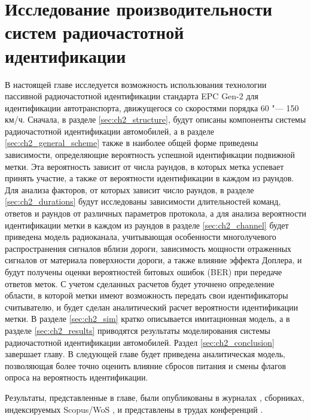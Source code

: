 \chapter{Исследование производительности систем радиочастотной идентификации}\label{ch:ch2}

В настоящей главе исследуется возможность использования технологии пассивной радиочастотной идентификации стандарта EPC Gen-2 \cite{StdGen2} для идентификации автотранспорта, движущегося со скоростями порядка 60 "--- 150 км/ч. Сначала, в разделе \ref{sec:ch2_structure}, будут описаны компоненты системы радиочастотной идентификации автомобилей, а в разделе \ref{sec:ch2_general_scheme} также в наиболее общей форме приведены зависимости, определяющие вероятность успешной идентификации подвижной метки. Эта вероятность зависит от числа раундов, в которых метка успевает принять участие, а также от вероятности идентификации в каждом из раундов. Для анализа факторов, от которых зависит число раундов, в разделе \ref{sec:ch2_durations} будут исследованы зависимости длительностей команд, ответов и раундов от различных параметров протокола, а для анализа вероятности идентификации метки в каждом из раундов в разделе \ref{sec:ch2_channel} будет приведена модель радиоканала, учитывающая особенности многолучевого распространения сигналов вблизи дороги, зависимость мощности отраженных сигналов от материала поверхности дороги, а также влияние эффекта Доплера, и будут получены оценки вероятностей битовых ошибок (BER) при передаче ответов меток. С учетом сделанных расчетов будет уточнено определение области, в которой метки имеют возможность передать свои идентификаторы считывателю, и будет сделан аналитический расчет вероятности идентификации метки. В разделе \ref{sec:ch2_sim} кратко описывается имитационная модель, а в разделе \ref{sec:ch2_results} приводятся результаты моделирования системы радиочастотной идентификации автомобилей. Раздел \ref{sec:ch2_conclusion} завершает главу. В следующей главе будет приведена аналитическая модель, позволяющая более точно оценить влияние сбросов питания и смены флагов опроса на вероятность идентификации.

Результаты, представленные в главе, были опубликованы в журналах \cite{RFID_JRFID2017,QS_TCOMM2012,QS_JITCS2013}, сборниках, индексируемых Scopus/WoS \cite{RFID_IEEERFID2017,RFID_DCCN2016_CCIS,RFID_SYNCHROINFO2018}, и представлены в трудах конференций \cite{Fedotov2020, Fedotov2020a, RFID_DCCN2015_RUS,RFID_DCCN2013_RUS}.





